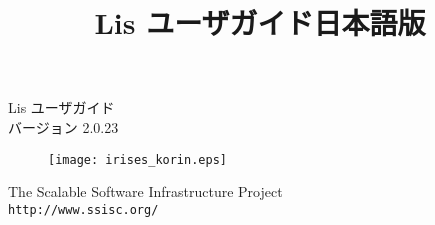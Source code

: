 \documentclass[a4paper]{jarticle}
\title{Lis ユーザガイド日本語版}
\author{}
\date{}
\begin{document}
\vspace*{4cm}
\begin{flushleft}
{\Large Lis ユーザガイド}\\
バージョン 2.0.23
\end{flushleft}

\vspace*{2cm}
\begin{figure}[h]
\texttt{[image: irises\_korin.eps]}
\end{figure}

\vspace*{2cm}
\begin{flushleft}
{\large The Scalable Software Infrastructure
Project\\
{\tt http://www.ssisc.org/}}\\
\end{flushleft}

\vspace*{5mm}
\thispagestyle{empty}
\end{document}
